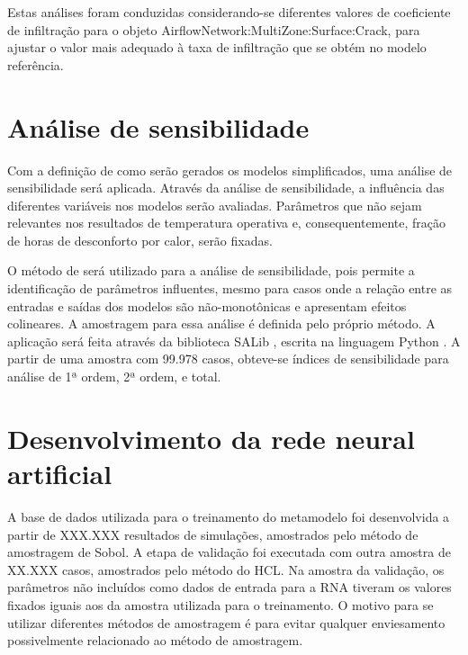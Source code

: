 \documentclass[brazil,hardcopy,openany,a5paper]{ufscthesis}
\begin{document}
		Estas análises foram conduzidas considerando-se diferentes valores de coeficiente de infiltração para o objeto AirflowNetwork:MultiZone:Surface:Crack, para ajustar o valor mais adequado à taxa de infiltração que se obtém no modelo referência.
		
		
		\section{Análise de sensibilidade}
		
		Com a definição de como serão gerados os modelos simplificados, uma análise de sensibilidade será aplicada. Através da análise de sensibilidade, a influência das diferentes variáveis nos modelos serão avaliadas. Parâmetros que não sejam relevantes nos resultados de temperatura operativa e, consequentemente, fração de horas de desconforto por calor, serão fixadas.
		
		O método de  \cite{Sobol1993} será utilizado para a análise de sensibilidade, pois permite a identificação de parâmetros influentes, mesmo para casos onde a relação entre as entradas e saídas dos modelos são não-monotônicas  e apresentam efeitos colineares. A amostragem para essa análise é definida pelo próprio método. A aplicação será feita através da biblioteca SALib \cite{Herman2017}, escrita na linguagem Python \cite{Python}. A partir de uma amostra com 99.978 casos, obteve-se índices de sensibilidade para análise de 1ª ordem, 2ª ordem, e total.
		
		\section{Desenvolvimento da rede neural artificial}
		
		A base de dados utilizada para o treinamento do metamodelo foi desenvolvida a partir de XXX.XXX resultados de simulações, amostrados pelo método de amostragem de Sobol. A etapa de validação foi executada com outra amostra de XX.XXX casos, amostrados pelo método do HCL. Na amostra da validação, os parâmetros não incluídos como dados de entrada para a RNA tiveram os valores fixados iguais aos da amostra utilizada para o treinamento. O motivo para se utilizar diferentes métodos de amostragem é para evitar qualquer enviesamento possivelmente relacionado ao método de amostragem.
		
\end{document}
